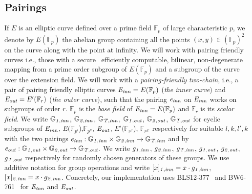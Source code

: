 \vspace{-0.05in}
\subsection{Pairings}
\label{sec:pairings}
\noindent If $E$ is an elliptic curve defined over a prime field $\mathbb{F}_{p}$ of large characteristic $p$, 
we denote by $E(\mathbb{F}_{p})$ the abelian group containing all the points $(x, y) \in (\mathbb{F}_{p})^2$ 
on the curve along with the point at infinity. We will work with pairing friendly curves i.e., those with a secure~\cite{secure_pairings,pairings_for_cryptographers} efficiently computable, bilinear, non-degenerate mapping from a prime order subgroup of $E(\mathbb{F}_{p})$ and a subgroup of the curve over the extension field.
We will work with a \emph{pairing-friendly two-chain}, i.e., a pair of pairing friendly elliptic curves $\mathit{E}_{\mathit{inn}}=E(\mathbb{F}_{p})$ (\emph{the inner curve}) and $\mathit{E}_{\mathit{out}}=E'(\mathbb{F}_{r})$ (\emph{the outer curve}), such that the pairing $\mathit{e}_{\mathit{inn}}$ on $\mathit{E}_{\mathit{inn}}$ works on subgroups of order $r$. $\mathbb{F}_p$ is the \emph{base field} of $\mathit{E}_{\mathit{inn}}=E(\mathbb{F}_{p})$ and $\mathbb{F}_r$ is its \emph{scalar field}. 
We write $\mathbb{G}_{\mathit{1,inn}}$, $\mathbb{G}_{\mathit{2,inn}}$, $\mathbb{G}_{\mathit{T,inn}}$, $\mathbb{G}_{\mathit{1,out}}$, $\mathbb{G}_{\mathit{2,out}}$, $\mathbb{G}_{\mathit{T,out}}$ for cyclic subgroups of $\mathit{E}_{\mathit{inn}}$, $E(\mathbb{F}_{p^l}$),$\mathbb{F}_{p^k}$, $\mathit{E}_{\mathit{out}}$, $E'(\mathbb{F}_{r^{l'}}$), $\mathbb{F}_{r^{k'}}$ respectively for suitable $l,k,l',k$ with the two pairings $\mathit{e}_{\mathit{inn}}:\mathbb{G}_{\mathit{1,inn}} \times \mathbb{G}_{\mathit{2,inn}} \rightarrow \mathbb{G}_{\mathit{T,inn}}$ and by $\mathit{e}_{\mathit{out}}:\mathbb{G}_{\mathit{1,out}} \times \mathbb{G}_{\mathit{2,out}} \rightarrow \mathbb{G}_{\mathit{T,out}}$.
We write $g_{\mathit{1,inn}}$, $g_{\mathit{2,inn}}$, $g_{\mathit{T,inn}}$, $g_{\mathit{1,out}}$, $g_{\mathit{2,out}}$, $g_{\mathit{T,out}}$ respectively for randomly chosen generators of these groups. We use additive notation for group operations and write $[x]_{\mathit{1,inn}} = x \cdot g_{\mathit{1,inn}}$, $[x]_{\mathit{2,inn}} = x \cdot g_{\mathit{2,inn}}$. Concretely, our implementation uses BLS12-377~\cite{zexe} and BW6-761~\cite{BW6} for $\mathit{E}_{\mathit{inn}}$ and $\mathit{E}_{\mathit{out}}$.
\vspace{-0.05in}
